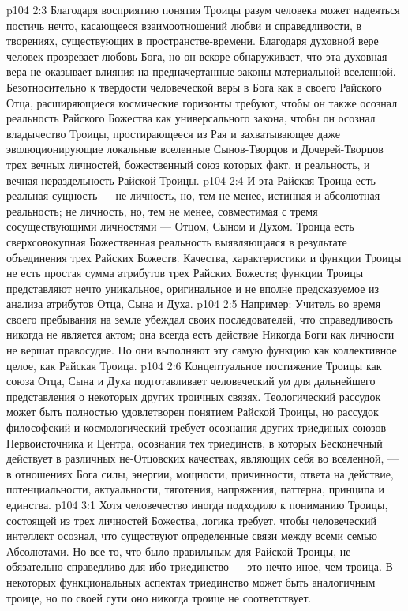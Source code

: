 \vs p104 2:3 Благодаря восприятию понятия Троицы разум человека может надеяться постичь нечто, касающееся взаимоотношений любви и справедливости, в творениях, существующих в пространстве\hyp{}времени. Благодаря духовной вере человек прозревает любовь Бога, но он вскоре обнаруживает, что эта духовная вера не оказывает влияния на предначертанные законы материальной вселенной. Безотносительно к твердости человеческой веры в Бога как в своего Райского Отца, расширяющиеся космические горизонты требуют, чтобы он также осознал реальность Райского Божества как универсального закона, чтобы он осознал владычество Троицы, простирающееся из Рая и захватывающее даже эволюционирующие локальные вселенные Сынов\hyp{}Творцов и Дочерей\hyp{}Творцов трех вечных личностей, божественный союз которых  факт, и реальность, и вечная нераздельность Райской Троицы.
\vs p104 2:4 И эта Райская Троица есть реальная сущность --- не личность, но, тем не менее, истинная и абсолютная реальность; не личность, но, тем не менее, совместимая с тремя сосуществующими личностями --- Отцом, Сыном и Духом. Троица есть сверхсовокупная Божественная реальность выявляющаяся в результате объединения трех Райских Божеств. Качества, характеристики и функции Троицы не есть простая сумма атрибутов трех Райских Божеств; функции Троицы представляют нечто уникальное, оригинальное и не вполне предсказуемое из анализа атрибутов Отца, Сына и Духа.
\vs p104 2:5 Например: Учитель во время своего пребывания на земле убеждал своих последователей, что справедливость никогда не является  актом; она всегда есть действие  Никогда Боги как личности не вершат правосудие. Но они выполняют эту самую функцию как коллективное целое, как Райская Троица.
\vs p104 2:6 Концептуальное постижение Троицы как союза Отца, Сына и Духа подготавливает человеческий ум для дальнейшего представления о некоторых других троичных связях. Теологический рассудок может быть полностью удовлетворен понятием Райской Троицы, но рассудок философский и космологический требует осознания других триединых союзов Первоисточника и Центра, осознания тех триединств, в которых Бесконечный действует в различных не\hyp{}Отцовских качествах, являющих себя во вселенной, --- в отношениях Бога силы, энергии, мощности, причинности, ответа на действие, потенциальности, актуальности, тяготения, напряжения, паттерна, принципа и единства.
\vs p104 3:1 Хотя человечество иногда подходило к пониманию Троицы, состоящей из трех личностей Божества, логика требует, чтобы человеческий интеллект осознал, что существуют определенные связи между всеми семью Абсолютами. Но все то, что было правильным для Райской Троицы, не обязательно справедливо для  ибо триединство --- это нечто иное, чем троица. В некоторых функциональных аспектах триединство может быть аналогичным троице, но по своей сути оно никогда троице не соответствует.
